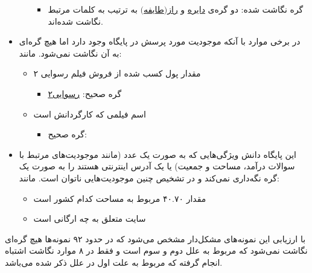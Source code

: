 \begin{itemize}
\begin{itemize}
\begin{itemize}
					\item گره نگاشت شده:
					دو گره‌ی
					\href{http://fkg.iust.ac.ir/resource/\%D8\%AF\%D8\%A7\%DB\%8C\%D8\%B1\%D9\%87}
					{دایره}
					و
					\href{http://fkg.iust.ac.ir/resource/\%D8\%B1\%D8\%A7\%D8\%B2\_\%28\%D8\%B7\%D8\%A7\%DB\%8C\%D9\%81\%D9\%87\%29}
					{راز\lr{\_}$)$طایفه$($}
				به ترتیب به کلمات مرتبط نگاشت شده‌اند.
				\end{itemize}
		\end{itemize}
		\item
در برخی موارد با آنکه موجودیت مورد پرسش در پایگاه وجود دارد اما هیچ گره‌ای به آن نگاشت نمی‌شود. مانند:
		\begin{itemize} 
			\item مقدار پول کسب شده از فروش فیلم رسوایی ۲
			\begin{itemize} 
				\small
				\item گره صحیح: 
				\href{http://fkg.iust.ac.ir/resource/\%D8\%B1\%D8\%B3\%D9\%88\%D8\%A7\%DB\%8C\%DB\%8C\_\%DB\%B2}
				{رسوایی\lr{\_}۲}
			\end{itemize}
			\item اسم فیلمی که  کارگردانش است
			\begin{itemize} 
				\small
				\item گره صحیح: 
				\href{http://fkg.iust.ac.ir/resource/Souheil_Ben-Barka}
				{}
			\end{itemize}
		\end{itemize}
	\item این پایگاه دانش ویژگی‌هایی که به صورت یک عدد (مانند موجودیت‌های مرتبط با سوالات درآمد، مساحت و جمعیت) یا یک آدرس اینترنتی هستند را به صورت یک گره نگه‌داری نمی‌کند و در تشخیص چنین موجودیت‌هایی ناتوان است. مانند:
		\begin{itemize} 
			\item مقدار ۴۰.۷۰ مربوط به مساحت کدام کشور است
			\item سایت  متعلق به چه ارگانی است
		\end{itemize}
\end{itemize}
با ارزیابی این نمونه‌های مشکل‌دار مشخص می‌شود که در حدود ۹۲\lr{\%} نمونه‌ها هیچ گره‌ای نگاشت نمی‌شود که مربوط به علل دوم و سوم است و فقط در ۸\lr{\%} موارد نگاشت اشتباه انجام گرفته که مربوط به علت اول در علل ذکر شده می‌باشد.

